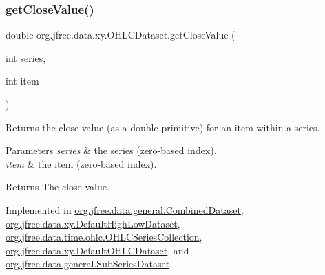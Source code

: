 \mbox{\label{interfaceorg_1_1jfree_1_1data_1_1xy_1_1_o_h_l_c_dataset_a5533f5d89de4aec9d67cfdc9289a1099}} 
\subsubsection{\texorpdfstring{get\+Close\+Value()}{getCloseValue()}}
{\footnotesize\ttfamily double org.\+jfree.\+data.\+xy.\+O\+H\+L\+C\+Dataset.\+get\+Close\+Value (\begin{DoxyParamCaption}\item[{int}]{series,  }\item[{int}]{item }\end{DoxyParamCaption})}

Returns the close-\/value (as a double primitive) for an item within a series.


\begin{DoxyParams}{Parameters}
{\em series} & the series (zero-\/based index). \\
\hline
{\em item} & the item (zero-\/based index).\\
\hline
\end{DoxyParams}
\begin{DoxyReturn}{Returns}
The close-\/value. 
\end{DoxyReturn}


Implemented in \mbox{\hyperlink{classorg_1_1jfree_1_1data_1_1general_1_1_combined_dataset_ad1bc2a134c68b370da40608ce58a6b36}{org.\+jfree.\+data.\+general.\+Combined\+Dataset}}, \mbox{\hyperlink{classorg_1_1jfree_1_1data_1_1xy_1_1_default_high_low_dataset_af316dffa7faed1c0c8c2f66b7b0acf5f}{org.\+jfree.\+data.\+xy.\+Default\+High\+Low\+Dataset}}, \mbox{\hyperlink{classorg_1_1jfree_1_1data_1_1time_1_1ohlc_1_1_o_h_l_c_series_collection_a599e2f3c9be3e6e5d9ab15e6f1bfc2ea}{org.\+jfree.\+data.\+time.\+ohlc.\+O\+H\+L\+C\+Series\+Collection}}, \mbox{\hyperlink{classorg_1_1jfree_1_1data_1_1xy_1_1_default_o_h_l_c_dataset_ae13de67fcd68bf22dd1436d5059212e7}{org.\+jfree.\+data.\+xy.\+Default\+O\+H\+L\+C\+Dataset}}, and \mbox{\hyperlink{classorg_1_1jfree_1_1data_1_1general_1_1_sub_series_dataset_abadc41ef36d20718c10f784dd786a5b1}{org.\+jfree.\+data.\+general.\+Sub\+Series\+Dataset}}.

